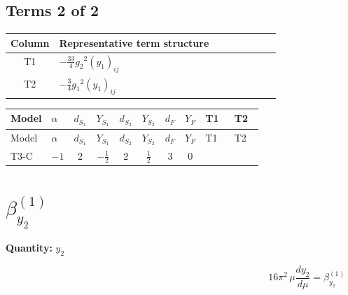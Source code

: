 \documentclass[8pt]{article}
\begin{document}
\begin{landscape}
\subsection*{Terms 2 of 2}
\begin{center}
\begin{tabular}{@{}c >{\raggedright\arraybackslash}p{0.82\linewidth}@{}}
\toprule
Column & Representative term structure \\
\midrule
T1 & \(\displaystyle -\frac{33}{4} {g_2}^2 \left({y_1}\right)_{ij}\) \\
\midrule
T2 & \(\displaystyle -\frac{3}{4} {g_1}^2 \left({y_1}\right)_{ij}\) \\
\midrule
\bottomrule
\end{tabular}
\end{center}
\smallskip
\tiny
\begin{longtable}{@{}llcccccc >{\raggedright\arraybackslash}p{0.21\linewidth} >{\raggedright\arraybackslash}p{0.21\linewidth}@{}}
\toprule
Model & $\alpha$ & $d_{S_1}$ & $Y_{S_1}$ & $d_{S_2}$ & $Y_{S_2}$ & $d_F$ & $Y_F$ & T1 & T2 \\
\midrule
\endfirsthead
\toprule
Model & $\alpha$ & $d_{S_1}$ & $Y_{S_1}$ & $d_{S_2}$ & $Y_{S_2}$ & $d_F$ & $Y_F$ & T1 & T2 \\
\midrule
\endhead
T3-C & $-1$ & $2$ & $-\frac{1}{2}$ & $2$ & $\frac{1}{2}$ & $3$ & $0$ & \scriptsize\adjustbox{max width=\linewidth}{$\begin{gathered} -\frac{33}{4} {g_2}^2 \left({y_1}\right)_{ij}\end{gathered}$} & \scriptsize\adjustbox{max width=\linewidth}{$\begin{gathered} -\frac{3}{4} {g_1}^2 \left({y_1}\right)_{ij}\end{gathered}$} \\
\midrule
\bottomrule
\end{longtable}
\clearpage
\section*{$\beta_{y_2}^{(1)}$}
\noindent\textbf{Quantity: }$y_2$\par\smallskip
\[16\pi^2\,\mu\frac{d y_2}{d\mu}=\beta_{y_2}^{(1)}\]

\end{landscape}
\end{document}
